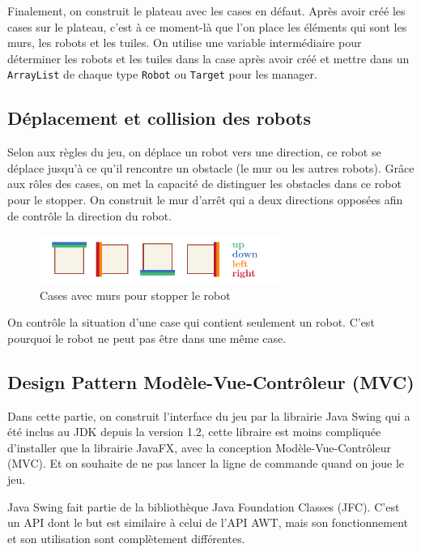 \documentclass[12pt, pdflatex]{article}
\begin{document}
    Finalement, on construit le plateau avec les cases en défaut. Après avoir créé les cases sur le plateau, c'est à ce moment-là que l'on place les éléments qui sont les murs, les robots et les tuiles. On utilise une variable intermédiaire pour déterminer les robots et les tuiles dans la case après avoir créé et mettre dans un \texttt{ArrayList} de chaque type \texttt{Robot} ou \texttt{Target} pour les manager.
    

    \subsection{Déplacement et collision des robots}
    Selon aux règles du jeu, on déplace un robot vers une direction, ce robot se déplace jusqu’à ce qu'il rencontre un obstacle (le mur ou les autres robots). Grâce aux rôles des cases, on met la capacité de distinguer les obstacles dans ce robot pour le stopper. On construit le mur d'arrêt qui a deux directions opposées afin de contrôle la direction du robot.

    \begin{figure}[H]
        \centering
        \includegraphics[width=0.7\textwidth]{sources/wall-stop.pdf}
        \caption{Cases avec murs pour stopper le robot}
    \end{figure}

    On contrôle la situation d'une case qui contient seulement un robot. C'est pourquoi le robot ne peut pas être dans une même case.


    \subsection{Design Pattern Modèle-Vue-Contrôleur (MVC)}
    Dans cette partie, on construit l'interface du jeu par la librairie Java Swing qui a été inclus au JDK depuis la version 1.2, cette libraire est moins compliquée d'installer que la librairie JavaFX, avec la conception Modèle-Vue-Contrôleur (MVC). Et on souhaite de ne pas lancer la ligne de commande quand on joue le jeu. 
    
    Java Swing\cite{swing} fait partie de la bibliothèque Java Foundation Classes (JFC). C'est un API dont le but est similaire à celui de l'API AWT, mais son fonctionnement et son utilisation sont complètement différentes.
\end{document}
